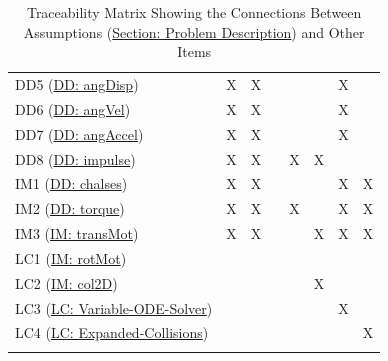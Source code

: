 \documentclass[12pt]{article}
\begin{document}
\begin{longtable}{l l l l l l l l}
DD5 (\hyperref[DD:angDisp]{DD: angDisp}) & X & X &  &  &  & X & 
\\
DD6 (\hyperref[DD:angVel]{DD: angVel}) & X & X &  &  &  & X & 
\\
DD7 (\hyperref[DD:angAccel]{DD: angAccel}) & X & X &  &  &  & X & 
\\
DD8 (\hyperref[DD:impulse]{DD: impulse}) & X & X &  & X & X &  & 
\\
IM1 (\hyperref[DD:chalses]{DD: chalses}) & X & X &  &  &  & X & X
\\
IM2 (\hyperref[DD:torque]{DD: torque}) & X & X &  & X &  & X & X
\\
IM3 (\hyperref[IM:transMot]{IM: transMot}) & X & X &  &  & X & X & X
\\
LC1 (\hyperref[IM:rotMot]{IM: rotMot}) &  &  &  &  &  &  & 
\\
LC2 (\hyperref[IM:col2D]{IM: col2D}) &  &  &  &  & X &  & 
\\
LC3 (\hyperref[lcVODES]{LC: Variable-ODE-Solver}) &  &  &  &  &  & X & 
\\
LC4 (\hyperref[lcEC]{LC: Expanded-Collisions}) &  &  &  &  &  &  & X
\\
\bottomrule
\caption{Traceability Matrix Showing the Connections Between Assumptions (\hyperref[Sec:ProbDesc]{Section: Problem Description}) and Other Items}
\label{Table:TraceyAssumpsOther}
\end{longtable}
\end{document}

